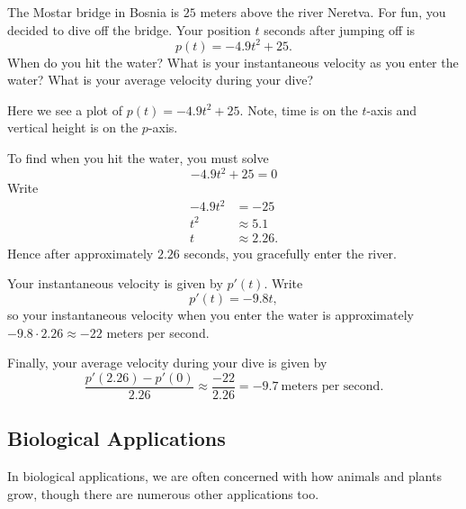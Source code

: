 \begin{example}
The Mostar bridge in Bosnia is $25$ meters above the river
Neretva. For fun, you decided to dive off the bridge. Your position
$t$ seconds after jumping off is
\[
p(t) = -4.9t^2 + 25.
\]
When do you hit the water? What is your instantaneous velocity as you
enter the water?  What is your average velocity during your dive?
\end{example}
\begin{marginfigure}
\caption{Here we see a plot of $p(t) = -4.9t^2 + 25$. Note, time is on
  the $t$-axis and vertical height is on the $p$-axis.}
\end{marginfigure}
\begin{solution}
To find when you hit the water, you must solve
\[
-4.9t^2 + 25 = 0
\]
Write
\begin{align*}
-4.9t^2 &= -25 \\
t^2 &\approx 5.1 \\ 
t &\approx 2.26.
\end{align*}
Hence after approximately $2.26$ seconds, you gracefully enter the
river.

Your instantaneous velocity is given by $p'(t)$. Write
\[
p'(t) = -9.8t,
\]
so your instantaneous velocity when you enter the water is
approximately $-9.8\cdot 2.26\approx -22$ meters per second.

Finally, your average velocity during your dive is given by
\[
\frac{p'(2.26) -p'(0)}{2.26} \approx \frac{-22}{2.26} =
-9.7~\text{meters per second}.
\]
\end{solution}





\subsection*{Biological Applications}

In biological applications, we are often concerned with how animals
and plants grow, though there are numerous other applications too.

